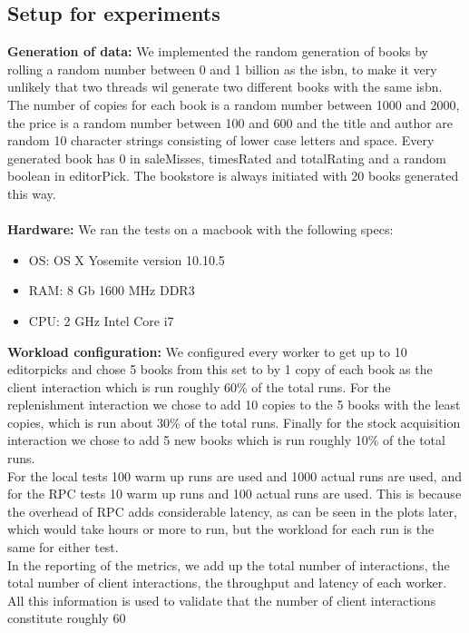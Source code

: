 \documentclass{article}
\theoremstyle{plain}
\theoremstyle{nonumberplain}
\begin{document}
\subsection{Setup for experiments}

\textbf{Generation of data:}
We implemented the random generation of books by rolling a random number between 0 and 1 billion as the isbn, to make it very unlikely that two threads wil generate two different books with the same isbn. The number of copies for each book is a random number between 1000 and 2000, the price is a random number between 100 and 600 and the title and author are random 10 character strings consisting of lower case letters and space. Every generated book has 0 in saleMisses, timesRated and totalRating and a random boolean in editorPick. The bookstore is always initiated with 20 books generated this way.\\\\
\textbf{Hardware:}
We ran the tests on a macbook with the following specs:
\begin{itemize}
	\item OS: OS X Yosemite version 10.10.5
	\item RAM: 8 Gb 1600 MHz DDR3
	\item CPU: 2 GHz Intel Core i7
\end{itemize}
\textbf{Workload configuration:}
We configured every worker to get up to 10 editorpicks and chose 5 books from this set to by 1 copy of each book as the client interaction which is run roughly 60\% of the total runs. For the replenishment interaction we chose to add 10 copies to the 5 books with the least copies, which is run about 30\% of the total runs. Finally for the stock acquisition interaction we chose to add 5 new books which is run roughly 10\% of the total runs.\\
For the local tests 100 warm up runs are used and 1000 actual runs are used, and for the RPC tests 10 warm up runs and 100 actual runs are used. This is because the overhead of RPC adds considerable latency, as can be seen in the plots later, which would take hours or more to run, but the workload for each run is the same for either test.\\
In the reporting of the metrics, we add up the total number of interactions, the total number of client interactions, the throughput and latency of each worker. All this information is used to validate that the number of client interactions constitute roughly 60%
\end{document}

